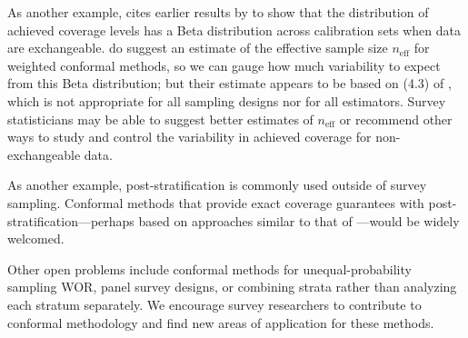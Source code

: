 \documentclass[10.5pt, letterpaper]{article}
\numberwithin{table}{section}
\numberwithin{figure}{section}
\numberwithin{equation}{section}
\begin{document}
As another example, \cite{vovk2013conditional} cites earlier results by \cite{guttman1970statistical} to show that the distribution of achieved coverage levels has a Beta distribution across calibration sets when data are exchangeable. \cite{angelopoulos2022gentle} do suggest an estimate of the effective sample size $n_\mathrm{eff}$ for weighted conformal methods, so we can gauge how much variability to expect from this Beta distribution; but their estimate appears to be based on (4.3) of \cite{kish1992weighting}, which is not appropriate for all sampling designs nor for all estimators. Survey statisticians may be able to suggest better estimates of $n_\mathrm{eff}$ or recommend other ways to study and control the variability in achieved coverage for non-exchangeable data.

As another example, post-stratification is commonly used outside of survey sampling. Conformal methods that provide exact coverage guarantees with post-stratification---perhaps based on approaches similar to that of \cite{fannjiang2022conformal}---would be widely welcomed.

Other open problems include conformal methods for unequal-probability sampling WOR, panel survey designs, or combining strata rather than analyzing each stratum separately. We encourage survey researchers to contribute to conformal methodology and find new areas of application for these methods.



\end{document}

